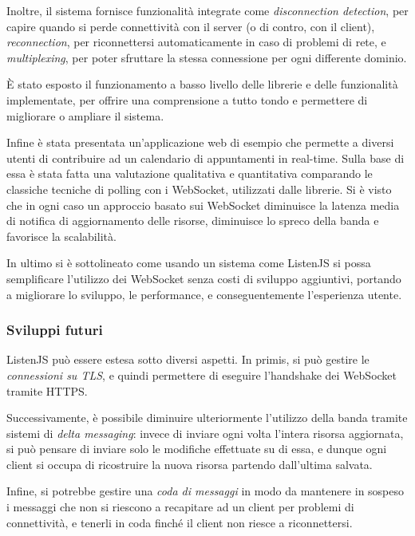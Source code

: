 \documentclass[12pt,a4paper,openright,twoside]{report}
\begin{document}
Inoltre, il sistema fornisce funzionalità integrate come \textit{disconnection detection}, per capire quando si perde connettività con il server (o di contro, con il client), \textit{reconnection}, per riconnettersi automaticamente in caso di problemi di rete, e \textit{multiplexing}, per poter sfruttare la stessa connessione per ogni differente dominio.

È stato esposto il funzionamento a basso livello delle librerie e delle funzionalità implementate, per offrire una comprensione a tutto tondo e permettere di migliorare o ampliare il sistema.

\bigskip

Infine è stata presentata un'applicazione web di esempio che permette a diversi utenti di contribuire ad un calendario di appuntamenti in real-time. Sulla base di essa è stata fatta una valutazione qualitativa e quantitativa comparando le classiche tecniche di polling con i WebSocket, utilizzati dalle librerie.  Si è visto che in ogni caso un approccio basato sui WebSocket diminuisce la latenza media di notifica di aggiornamento delle risorse, diminuisce lo spreco della banda e favorisce la scalabilità.

In ultimo si è sottolineato come usando un sistema come ListenJS si possa semplificare l'utilizzo dei WebSocket senza costi di sviluppo aggiuntivi, portando a migliorare lo sviluppo, le performance, e conseguentemente l'esperienza utente.

\subsubsection{Sviluppi futuri}
ListenJS può essere estesa sotto diversi aspetti. In primis, si può gestire le \textit{connessioni su TLS}, e quindi permettere di eseguire l'handshake dei WebSocket tramite HTTPS.

Successivamente, è possibile diminuire ulteriormente l'utilizzo della banda tramite sistemi di \textit{delta messaging}: invece di inviare ogni volta l'intera risorsa aggiornata, si può pensare di inviare solo le modifiche effettuate su di essa, e dunque ogni client si occupa di ricostruire la nuova risorsa partendo dall'ultima salvata.

Infine, si potrebbe gestire una \textit{coda di messaggi} in modo da mantenere in sospeso i messaggi che non si riescono a recapitare ad un client per problemi di connettività, e tenerli in coda finché il client non riesce a riconnettersi.
\clearpage{\pagestyle{empty}\cleardoublepage}




\end{document}
